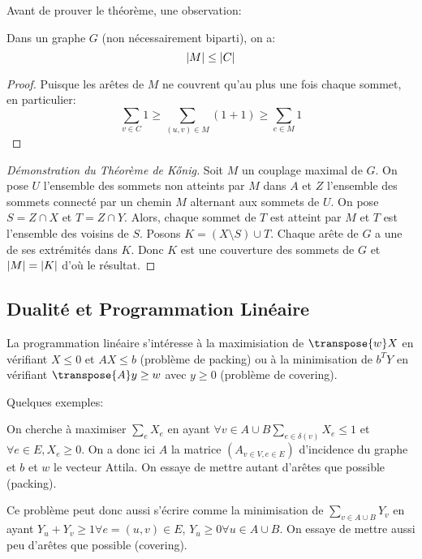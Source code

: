 \documentclass[math, info]{cours}
\begin{document}
Avant de prouver le théorème, une observation:
\begin{proposition}
	Dans un graphe $G$ (non nécessairement biparti), on a:
	\begin{equation*}
		\left|M\right| \leq \left|C\right|
	\end{equation*}
	\label{prop:weakduality}
\end{proposition}
\begin{proof}
	Puisque les arêtes de $M$ ne couvrent qu'au plus une fois chaque sommet, en particulier:
	\begin{equation*}
		\sum_{v \in C} 1 \geq \sum_{(u, v) \in M} \left(1 + 1\right) \geq \sum_{e \in M} 1
	\end{equation*}
\end{proof}

\begin{proof}[Démonstration du Théorème de K\H{o}nig]
	Soit $M$ un couplage maximal de $G$.
	On pose $U$ l'ensemble des sommets non atteints par $M$ dans $A$ et $Z$ l'ensemble des sommets connecté par un chemin $M$ alternant aux sommets de $U$.
	On pose $S = Z \cap X$ et $T = Z \cap Y$.
	Alors, chaque sommet de $T$ est atteint par $M$ et $T$ est l'ensemble des voisins de $S$.
	Posons $K  = \left( X \setminus S \right)\cup T$. Chaque arête de $G$ a une de ses extrémités dans $K$.
	Donc $K$ est une couverture des sommets de $G$ et $\left|M\right| = \left|K\right|$ d'où le résultat.
\end{proof}

\subsection{Dualité et Programmation Linéaire}
\begin{definition}
	La programmation linéaire s'intéresse à la maximisiation de $\transpose{w}X$ en vérifiant $X\leq 0$ et $AX\leq b$ (problème de packing) ou à la minimisation de $b^{T}Y$ en vérifiant $\transpose{A}y \geq w$ avec $y \geq 0$ (problème de covering).
	\label{def:linearprog}
\end{definition}

Quelques exemples:
\begin{exemple}
	On cherche à maximiser $\sum_{e} X_{e}$ en ayant $\forall v \in A \cup B \sum_{e \in \delta(v)} X_{e} \leq 1$ et $\forall e \in E, X_{e} \geq 0$.
	On a donc ici $A$ la matrice $(A_{v\in V, e\in E})$ d'incidence du graphe et $b$ et $w$ le vecteur Attila.
	On essaye de mettre autant d'arêtes que possible (packing).

	Ce problème peut donc aussi s'écrire comme la minimisation de $\sum_{v \in A\cup B} Y_{v}$ en ayant $Y_{u} + Y_{v} \geq 1 \forall e = (u, v) \in E$, $Y_{u} \geq 0 \forall u \in A\cup B$.
	On essaye de mettre aussi peu d'arêtes que possible (covering).
\end{exemple}
\end{document}
